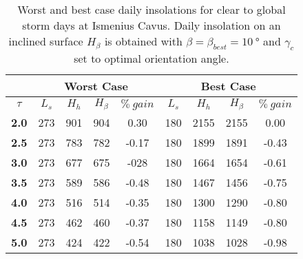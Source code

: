 \begin{table}[h]
\footnotesize
\centering
\caption[Worst and best case daily insolations for global storm days at Ismenius Cavus]
{Worst and best case daily insolations for clear to global storm days at Ismenius Cavus. Daily insolation on an inclined surface $H_{\beta}$ is obtained with $\beta = \beta_{best} = \SI{10}{\degree}$ and $\gamma_{c}$ set to optimal orientation angle.}
\label{tab:insolation-ismenius-cavus-global-storm-days}
\begin{tabular}{c|c|c|c|c|c|c|c|c|}
\cline{2-9}
\multicolumn{1}{l|}{} & \multicolumn{4}{c|}{\textbf{Worst Case}} & \multicolumn{4}{c|}{\textbf{Best Case}} \\ \hline
\multicolumn{1}{|c|}{$\tau$} & $L_{s}$ & $H_{h}$ & $H_{\beta}$ & $\%\:gain$ & $L_{s}$ & $H_{h}$ & $H_{\beta}$ & $\%\:gain$ \\ \hline
\multicolumn{1}{|c|}{\textbf{2.0}} & 273 & 901 & 904 & 0.30 & 180 & 2155 & 2155 & 0.00 \\ \hline
\multicolumn{1}{|c|}{\textbf{2.5}} & 273 & 783 & 782 & -0.17 & 180 & 1899 & 1891 & -0.43 \\ \hline
\multicolumn{1}{|c|}{\textbf{3.0}} & 273 & 677 & 675 & -028 & 180 & 1664 & 1654 & -0.61 \\ \hline
\multicolumn{1}{|c|}{\textbf{3.5}} & 273 & 589 & 586 & -0.48 & 180 & 1467 & 1456 & -0.75 \\ \hline
\multicolumn{1}{|c|}{\textbf{4.0}} & 273 & 516 & 514 & -0.35 & 180 & 1300 & 1290 & -0.80 \\ \hline
\multicolumn{1}{|c|}{\textbf{4.5}} & 273 & 462 & 460 & -0.37 & 180 & 1158 & 1149 & -0.80 \\ \hline
\multicolumn{1}{|c|}{\textbf{5.0}} & 273 & 424 & 422 & -0.54 & 180 & 1038 & 1028 & -0.98 \\ \hline
\end{tabular}
\end{table}
